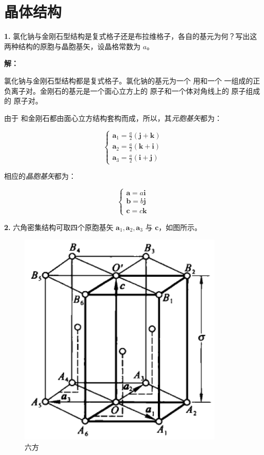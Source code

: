 \chapter{晶体结构\label{ch:1}}

\noindent \textbf{1.\quad} 氯化钠与金刚石型结构是复式格子还是布拉维格子，各自的基元为何？写出这两种结构的原胞与晶胞基矢，设晶格常数为 $a$。

\noindent \textbf{解：}

氯化钠与金刚石型结构都是复式格子。氯化钠的基元为一个  用和一个  一组成的正负离子对。金刚石的基元是一个面心立方上的  原子和一个体对角线上的  原子组成的  原子对。

由于  和金刚石都由面心立方结构套构而成，所以，其\emph{元胞基矢}都为：

\begin{equation*}
    \begin{cases}
        \mathbf{a}_1 = \frac{a}{2} (\mathbf{j} + \mathbf{k}) \\
        \mathbf{a}_2 = \frac{a}{2} (\mathbf{k} + \mathbf{i}) \\
        \mathbf{a}_3 = \frac{a}{2} (\mathbf{i} + \mathbf{j})
    \end{cases}
\end{equation*}

相应的\emph{晶胞基矢}都为：

\begin{equation*}
    \begin{cases}
        \mathbf{a} = a \mathbf{i} \\
        \mathbf{b} = b \mathbf{j} \\
        \mathbf{c} = c \mathbf{k}
    \end{cases}
\end{equation*}

\noindent \textbf{2.\quad} 六角密集结构可取四个原胞基矢 $\mathbf{a}_1, \mathbf{a}_2, \mathbf{a}_3$ 与 $\mathbf{c}$，如图所示。

\begin{figure}[htbp]
    \centering
    \includegraphics{pic/六方.png}
    \caption{六方}
    \label{fig:1.1}
\end{figure}

